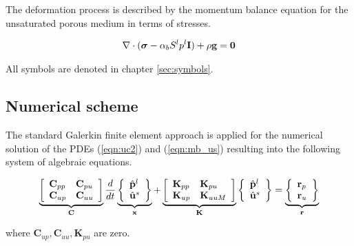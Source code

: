 \documentclass[twoside]{report} %
\def\g{\mathbf g}
\providecommand{\s}{\bm\sigma}
\def\K{\mathbf{K}}
\def\C{\mathbf{C}}
\begin{document}
The deformation process is described by the momentum balance equation for the unsaturated porous medium in terms of stresses.

\begin{gather}
\nabla\cdot
(\s - \alpha_b S^l p^l \bf I) + \rho\g = 0
\label{eqn:mb_us}
\end{gather}

All symbols are denoted in chapter \ref{sec:symbols}.
%

\subsection{Numerical scheme}

The standard Galerkin finite element approach is applied for the numerical solution of the PDEs (\ref{eqn:uc2}) and (\ref{eqn:mb_us}) resulting into the following system of algebraic equations.

\begin{eqnarray}
\underbrace{
\left[
\begin{array}{ll}
\mathbf{C}_{pp} & \mathbf{C}_{pu}
\\
\mathbf{C}_{up} & \mathbf{C}_{uu}
\end{array}
\right]
}_{\mathbf C}
%
\frac{d}{dt}
\underbrace{
\left\{
\begin{array}{l}
\hat\PressureVec^l
\\
\hat\Disp^s 
\end{array}
\right\}
}_{\mathbf x}
%
+
%
\underbrace{
\left[
\begin{array}{ll}
\mathbf{K}_{pp} & \mathbf{K}_{pu}
\\
\mathbf{K}_{up} & \mathbf{K}_{uuM}
\end{array}
\right]
}_{\mathbf K}
%
\left\{
\begin{array}{l}
\hat\PressureVec^l
\\
\hat\Disp^s 
\end{array}
\right\}
%
=
\underbrace{
\left\{
\begin{array}{l}
\mathbf{r}_p
\\
\mathbf{r}_u
\end{array}
\right\}
}_{\mathbf{r}}
\nonumber
\\
\end{eqnarray}

where $\C_{up}, \C_{uu}, \K_{pu}$ are zero.
\end{document}
